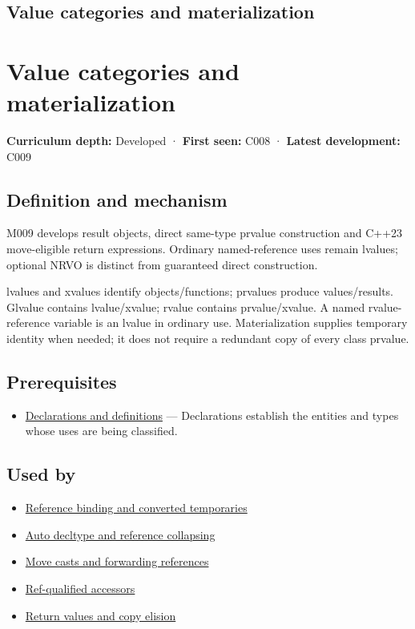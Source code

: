 \hypertarget{appendix-1121b30eaeb0}{}
\section*{Value categories and materialization}
\chapter{Value categories and materialization}\label{appendix-1121b30eaeb0-value-categories-and-materialization}

\textbf{Curriculum depth:} Developed · \textbf{First seen:} C008 · \textbf{Latest development:} C009

\section{Definition and mechanism}\label{appendix-1121b30eaeb0-definition-and-mechanism}

M009 develops result objects, direct same-type prvalue construction and C++23 move-eligible return expressions. Ordinary named-reference uses remain lvalues; optional NRVO is distinct from guaranteed direct construction.

lvalues and xvalues identify objects/functions; prvalues produce values/results. Glvalue contains lvalue/xvalue; rvalue contains prvalue/xvalue. A named rvalue-reference variable is an lvalue in ordinary use. Materialization supplies temporary identity when needed; it does not require a redundant copy of every class prvalue.

\section{Prerequisites}\label{appendix-1121b30eaeb0-prerequisites}

\begin{itemize}
\tightlist
\item
  \hyperref[appendix-2e4d494c2d94]{Declarations and definitions} --- Declarations establish the entities and types whose uses are being classified.
\end{itemize}

\section{Used by}\label{appendix-1121b30eaeb0-used-by}

\begin{itemize}
\tightlist
\item
  \hyperref[appendix-37856d997bb0]{Reference binding and converted temporaries}
\item
  \hyperref[appendix-5d4252a42886]{Auto decltype and reference collapsing}
\item
  \hyperref[appendix-0104b704fb11]{Move casts and forwarding references}
\item
  \hyperref[appendix-d42039b1d6f7]{Ref-qualified accessors}
\item
  \hyperref[appendix-b08d3788c5c6]{Return values and copy elision}
\end{itemize}

